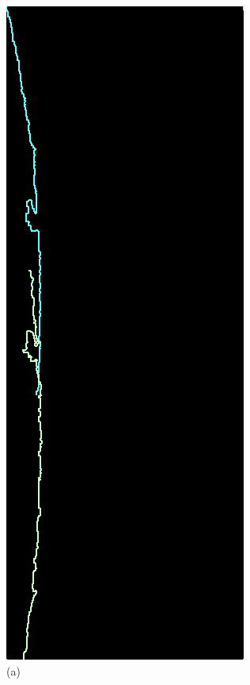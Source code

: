 \begin{figure}[H]
\begin{minipage}{0.24\textwidth}
        \caption*{(a)}
    \end{minipage}\hfill
    \begin{minipage}{0.24\textwidth}
        \centering
        \includegraphics[width=\textwidth]{images/216_match.png} %

\end{minipage}
\end{figure}
